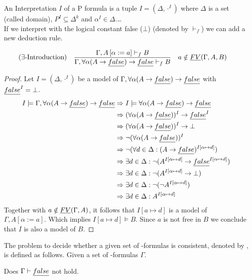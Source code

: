 An Interpretation $I$ of a P formula is a tuple $I=(\Delta,\cdot^I)$ where $\Delta$ is a set (called domain), $P^I\subseteq\Delta^k$ and $\alpha^I\in\Delta$.\dots\\
If we interpret \false{} with the logical constant false ($\bot$) (denoted by $\vdash_f$) we can add a new deduction rule.
\begin{mdframed}
	\begin{align*}
		  & (\exists\text{-Introduction}) &   & \frac 
		{\Gamma,A\left[\alpha:=a\right]\vdash_f B}
		{\Gamma,\forall\alpha(A\to\emph{false})\to\emph{false}\vdash_f B} && a\notin\emph{FV}(\Gamma,A,B)
	\end{align*}
\end{mdframed}
\begin{proof}
	Let $I=(\Delta,\cdot^I)$ be a model of $\Gamma,\forall\alpha(A\to\emph{false})\to\emph{false}$ with $\emph{false}^I=\bot$.
	\begin{align*}
		I\models\Gamma,\forall\alpha(A\to\emph{false})\to\emph{false} & \Rightarrow I\models\forall\alpha(A\to\emph{false})\to\emph{false}                                                          \\
        & \Rightarrow (\forall\alpha(A\to\emph{false}))^I\to\emph{false}^I                                                            \\
        & \Rightarrow (\forall\alpha(A\to\emph{false}))^I\to\bot                                                                \\
        & \Rightarrow \neg(\forall\alpha(A\to\emph{false}))^I                                                                   \\
        & \Rightarrow \neg(\forall d\in\Delta:(A\to\emph{false})^{I\left[\alpha\mapsto d\right]})                               \\
        & \Rightarrow \exists d\in\Delta:\neg(A^{I\left[\alpha\mapsto d\right]}\to\emph{false}^{I\left[\alpha\mapsto d\right]}) \\
        & \Rightarrow \exists d\in\Delta:\neg(A^{I\left[\alpha\mapsto d\right]}\to\bot)                                   \\
        & \Rightarrow \exists d\in\Delta:\neg(\neg A^{I\left[\alpha\mapsto d\right]})                                     \\
        & \Rightarrow \exists d\in\Delta:A^{I\left[\alpha\mapsto d\right]}
	\end{align*}
	Together with $a\notin\emph{FV}(\Gamma,A)$, it follows that $I\left[a\mapsto d\right]$ is a model of $\Gamma,A\left[\alpha:=a\right]$. Which implies $I\left[a\mapsto d\right]\models B$.	Since $a$ is not free in $B$ we conclude that $I$ is also a model of $B$.
\end{proof}
\begin{definition}
	The problem to decide whether a given set of \SysP-formulas is consistent, denoted by \PCons, is defined as follows.
	Given a set of \SysP-formulas $\Gamma$. 
	\begin{center}
		Does $\Gamma\vdash\emph{false}$ not hold.
	\end{center}
\end{definition}
